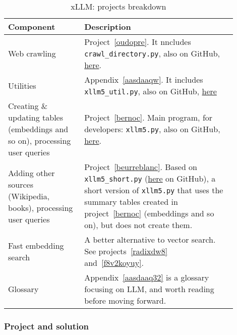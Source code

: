 \documentclass[oneside,10pt]{book}
\begin{document}
\begin{table}[ht]
    \centering
    \begin{tabular}{|p{0.3\linewidth} | p{0.6\linewidth}|}
     \hline
      Component  & Description \\ 
     \hline
    \hline

      Web crawling &  Project~\ref{oudopre}. It nncludes \texttt{crawl\_directory.py}, also on GitHub, 
 \href{https://github.com/VincentGranville/Large-Language-Models/blob/main/crawl_directory.py}{here}.\\
     \hline

      Utilities & Appendix~\ref{aasdaaqw}. It includes \texttt{xllm5\_util.py}, also on GitHub, \href{https://github.com/VincentGranville/Large-Language-Models/blob/main/xllm5/xllm5_util.py}{here}\\
\hline

Creating \& updating tables (embeddings and so on), processing user queries & Project~\ref{bernoc}. Main program, for developers: 
\texttt{xllm5.py}, also on GitHub, \href{https://github.com/VincentGranville/Large-Language-Models/blob/main/xllm5/xllm5.py}{here}. \\
\hline

Adding other sources (Wikipedia, books), processing user queries & Project~\ref{beurreblanc}. Based on 
\texttt{xllm5\_short.py} (\href{https://github.com/VincentGranville/Large-Language-Models/blob/main/xllm5/xllm5.py}{here} on GitHub), a short version of \texttt{xllm5.py} that uses the
 summary tables created in project~\ref{bernoc} (embeddings and so on), but does not create them. \\
     \hline

Fast embedding search & A better alternative to vector search. See projects~\ref{radixdw8} and~\ref{f8v2koyuy}.\\
\hline

Glossary & Appendix~\ref{aasdaaq32} is a glossary focusing on LLM, and worth reading before moving forward. \\
\hline

    \end{tabular}
    \caption{xLLM: projects breakdown}
    \label{tab:over4l}
\end{table}

\subsubsection{Project and solution}
\end{document}
